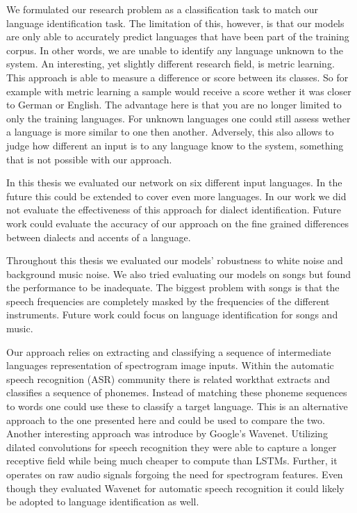 We formulated our research problem as a classification task to match our language identification task. The limitation of this, however, is that our models are only able to accurately predict languages that have been part of the training corpus. In other words, we are unable to identify any language unknown to the system. An interesting, yet slightly different research field, is metric learning. This approach is able to measure a difference or score between its classes. So for example with metric learning a sample would receive a score wether it was closer to German or English. The advantage here is that you are no longer limited to only the training languages. For unknown languages one could still assess wether a language is more similar to one then another. Adversely, this also allows to judge how different an input is to any language know to the system, something that is not possible with our approach.

In this thesis we evaluated our network on six different input languages. In the future this could be extended to cover even more languages. In our work we did not evaluate the effectiveness of this approach for dialect identification. Future work could evaluate the accuracy of our approach on the fine grained differences between dialects and accents of a language.

Throughout this thesis we evaluated our models' robustness to white noise and background music noise. We also tried evaluating our models on songs but found the performance to be inadequate. The biggest problem with songs is that the speech frequencies are completely masked by the frequencies of the different instruments. Future work could focus on language identification for songs and music.

Our approach relies on extracting and classifying a sequence of intermediate languages representation of spectrogram image inputs. Within the automatic speech recognition (ASR) community there is related work\cite{song2015end}that extracts and classifies a sequence of phonemes. Instead of matching these phoneme sequences to words one could use these to classify a target language. This is an alternative approach to the one presented here and could be used to compare the two. Another interesting approach was introduce by Google's Wavenet\cite{van2016wavenet}. Utilizing dilated convolutions for speech recognition they were able to capture a longer receptive field while being much cheaper to compute than LSTMs. Further, it operates on raw audio signals forgoing the need for spectrogram features.  Even though they evaluated Wavenet for automatic speech recognition it could likely be adopted to language identification as well. 

